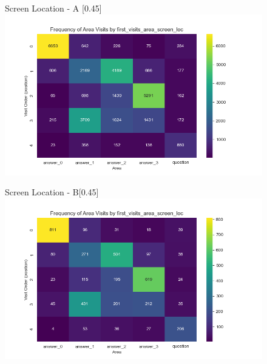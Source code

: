 \documentclass{article}
\begin{document}
\begin{figure}[H]
  \centering
  \begin{subcaptionbox}{Screen Location - A \label{fig:sl_a}}[0.45\textwidth]
    {\centering\includegraphics[width=\linewidth]{plots/visits/matrix__first_visits_area_screen_loc_hunters_A.png}}
  \end{subcaptionbox}
  \hfill
  \begin{subcaptionbox}{Screen Location - B\label{fig:sl_b}}[0.45\textwidth]
    {\centering\includegraphics[width=\linewidth]{plots/visits/matrix__first_visits_area_screen_loc_hunters_B.png}}
  \end{subcaptionbox}
  
  \vspace{1em} %


\end{figure}
\end{document}
